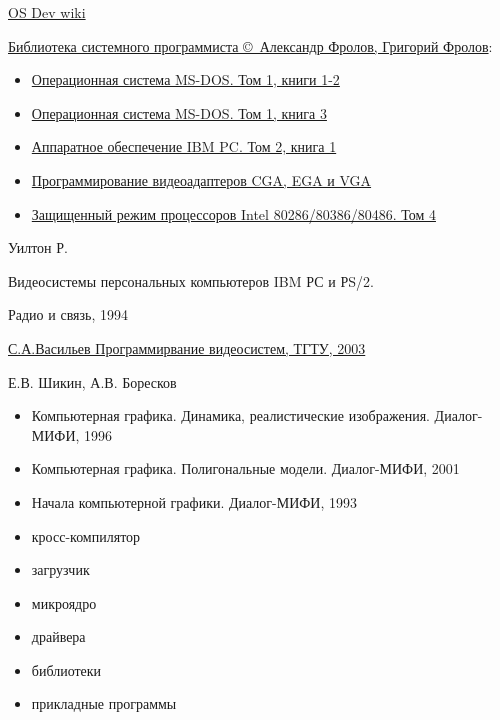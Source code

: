 \secdown


\href{http://wiki.osdev.org}{OS Dev wiki}

\bigskip

\href{http://www.frolov-lib.ru/bsp.html}{Библиотека системного программиста
\copyright\ Александр Фролов, Григорий Фролов}:

\begin{itemize}
  \item \href{http://www.frolov-lib.ru/books/bsp/v01a/index.html}{Операционная
  система MS-DOS. Том 1, книги 1-2}
  \item \href{http://www.frolov-lib.ru/books/bsp/v01b/index.html}{Операционная
  система MS-DOS. Том 1, книга 3}
  \item \href{http://www.frolov-lib.ru/books/bsp/v02/index.html}{Аппаратное
  обеспечение IBM PC. Том 2, книга 1}
  \item \href{http://www.frolov-lib.ru/books/bsp/v03/index.html}{Программирование видеоадаптеров CGA, EGA и VGA}
  \item \href{http://www.frolov-lib.ru/books/bsp/v06/index.html}{Защищенный
  режим процессоров Intel 80286/80386/80486. Том 4}
\end{itemize}

\bigskip

Уилтон Р. 

Видеосистемы персональных компьютеров IBM РС и РS/2.

Радио и связь, 1994

\bigskip

\href{http://ict.informika.ru/ft/004761/vasilev.pdf}{С.А.Васильев
Программирвание видеосистем, ТГТУ, 2003}

\bigskip

Е.В. Шикин, А.В. Боресков

\begin{itemize}
\item Компьютерная графика. Динамика, реалистические изображения.
Диалог-МИФИ, 1996
\item Компьютерная графика. Полигональные модели. Диалог-МИФИ, 2001
\item Начала компьютерной графики. Диалог-МИФИ, 1993
\end{itemize}


\begin{itemize}
  \item кросс-компилятор
  \item загрузчик
  \item микроядро
  \item драйвера
  \item библиотеки
  \item прикладные программы
\end{itemize}

